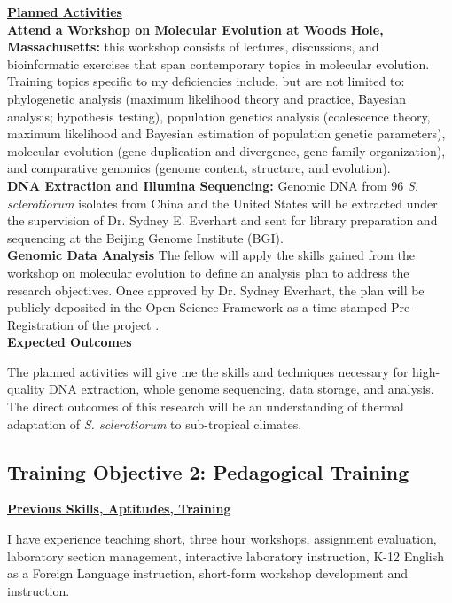 \documentclass[12pt,letterpaper]{article}
\begin{document}
\noindent \textbf{\underline{Planned Activities}}\\
\noindent \textbf{Attend a Workshop on Molecular Evolution at Woods Hole, Massachusetts:} this workshop consists of lectures, discussions, and bioinformatic exercises that span contemporary topics in molecular evolution. Training topics specific to my deficiencies include, but are not limited to: phylogenetic analysis (maximum likelihood theory and practice, Bayesian analysis; hypothesis testing), population genetics analysis (coalescence theory, maximum likelihood and Bayesian estimation of population genetic parameters), molecular evolution (gene duplication and divergence, gene family organization), and comparative genomics (genome content, structure, and evolution).\\
\noindent \textbf{DNA Extraction and Illumina Sequencing:} Genomic DNA from 96 \textit{S. sclerotiorum} isolates from China and the United States will be extracted under the supervision of Dr. Sydney E. Everhart and sent for library preparation and sequencing at the Beijing Genome Institute (BGI). \\
\noindent \textbf{Genomic Data Analysis} The fellow will apply the skills gained from the workshop on molecular evolution to define an analysis plan to address the research objectives. Once approved by Dr. Sydney Everhart, the plan will be publicly deposited in the Open Science Framework as a time-stamped Pre-Registration of the project \citep{nosek2017osf}.\\

\noindent \textbf{\underline{Expected Outcomes}}

The planned activities will give me the skills and techniques necessary for high-quality DNA extraction, whole genome sequencing, data storage, and analysis. The direct outcomes of this research will be an understanding of thermal adaptation of \textit{S. sclerotiorum} to sub-tropical climates.

\subsection{Training Objective 2: Pedagogical Training}

\noindent \textbf{\underline{Previous Skills, Aptitudes, Training}}

I have experience teaching short, three hour workshops, assignment evaluation, laboratory section management, interactive laboratory instruction, K-12 English as a Foreign Language instruction, short-form workshop development and instruction.\\
\end{document}
